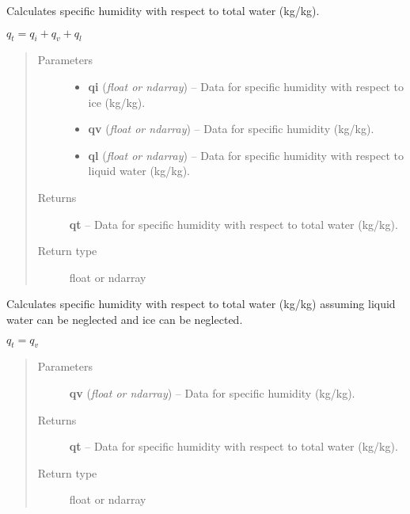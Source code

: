 \documentclass[letterpaper,10pt,english]{sphinxmanual}
\begin{document}
\begin{fulllineitems}
\label{atmos:atmos.equations.qt_from_qi_qv_ql}
Calculates specific humidity with respect to total water (kg/kg).

\(q_t = q_i+q_v+q_l\)
\begin{quote}\begin{description}
\item[{Parameters}] \leavevmode\begin{itemize}
\item {} 
\textbf{qi} (\emph{float or ndarray}) -- Data for specific humidity with respect to ice (kg/kg).

\item {} 
\textbf{qv} (\emph{float or ndarray}) -- Data for specific humidity (kg/kg).

\item {} 
\textbf{ql} (\emph{float or ndarray}) -- Data for specific humidity with respect to liquid water (kg/kg).

\end{itemize}

\item[{Returns}] \leavevmode
\textbf{qt} --
Data for specific humidity with respect to total water (kg/kg).

\item[{Return type}] \leavevmode
float or ndarray

\end{description}\end{quote}

\end{fulllineitems}


\begin{fulllineitems}
\label{atmos:atmos.equations.qt_from_qv}
Calculates specific humidity with respect to total water (kg/kg) assuming liquid
water can be neglected and ice can be neglected.

\(q_t = q_v\)
\begin{quote}\begin{description}
\item[{Parameters}] \leavevmode
\textbf{qv} (\emph{float or ndarray}) -- Data for specific humidity (kg/kg).

\item[{Returns}] \leavevmode
\textbf{qt} --
Data for specific humidity with respect to total water (kg/kg).

\item[{Return type}] \leavevmode
float or ndarray

\end{description}\end{quote}

\end{fulllineitems}
\end{document}
